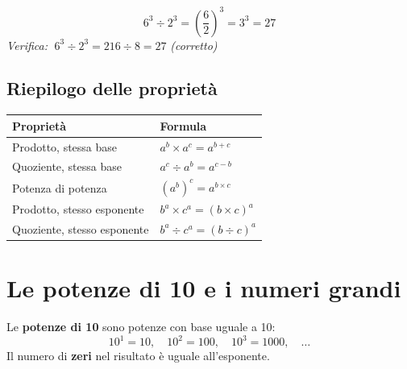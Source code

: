 \begin{esempio}
  \[
    6^3 \div 2^3 = \left(\frac{6}{2}\right)^3 = 3^3 = 27
  \]
  \textit{Verifica:} $\;6^3 \div 2^3 = 216 \div 8 = 27$ \quad\textit{(corretto)}
\end{esempio}

\subsection{Riepilogo delle proprietà}

\begin{center}
  \begin{tabular}{@{} l l @{}}
    \toprule
    \textbf{Proprietà}          & \textbf{Formula}                  \\
    \midrule
    Prodotto, stessa base       & $a^b \times a^c = a^{b+c}$        \\[4pt]
    Quoziente, stessa base      & $a^c \div a^b = a^{c-b}$          \\[4pt]
    Potenza di potenza          & $(a^b)^c = a^{b \times c}$        \\[4pt]
    Prodotto, stesso esponente  & $b^a \times c^a = (b \times c)^a$ \\[4pt]
    Quoziente, stesso esponente & $b^a \div c^a = (b \div c)^a$     \\
    \bottomrule
  \end{tabular}
\end{center}

\section{Le potenze di 10 e i numeri grandi}

\begin{definizione}
  Le \textbf{potenze di 10} sono potenze con base uguale a 10:
  \[
    10^1 = 10, \quad 10^2 = 100, \quad 10^3 = 1000, \quad \ldots
  \]
  Il numero di \textbf{zeri} nel risultato è uguale all'esponente.
\end{definizione}

